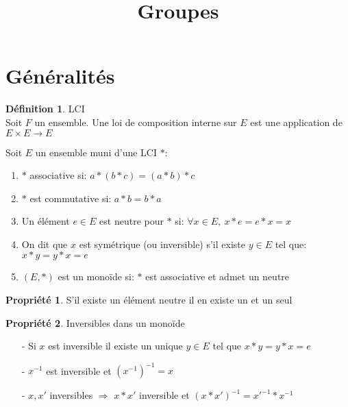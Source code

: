 \documentclass[fleqn]{article}
\title{Groupes}
\date{}
\theoremstyle{definition} \newtheorem*{defi}{D\'efinition}
\theoremstyle{definition} \newtheorem*{theo}{Th\'eor\`eme}
\theoremstyle{definition} \newtheorem*{coro}{Corollaire}
\theoremstyle{remark} \newtheorem*{rqs}{Remarques}
\theoremstyle{definition} \newtheorem*{prop}{Propri\'et\'e}
\begin{document}
\maketitle

\section{G\'en\'eralit\'es}
\begin{defi} LCI \\
Soit $F$ un ensemble. Une loi de composition interne sur $E$ est une application de $E\times E \rightarrow E$
\end{defi}

Soit $E$ un ensemble muni d'une LCI $*$:
\begin{enumerate}
	\item $*$ associative si: $a*(b*c) = (a*b)*c$
	\item $*$ est commutative si: $a*b = b*a$
	\item Un \'el\'ement $e \in E$ est neutre pour $*$ si: $\forall x \in E,\ x*e = e*x = x$
	\item On dit que $x$ est sym\'etrique (ou inversible) s'il existe $y \in E$ tel que: $x*y = y*x = e$
	\item $(E,*)$ est un mono\"ide si: $*$ est associative et admet un neutre
\end{enumerate}

\begin{prop}
	S'il existe un \'el\'ement neutre il en existe un et un seul
\end{prop}

\begin{prop} Inversibles dans un mono\"ide
	\begin{itemize}
		\item [-] Si $x$ est inversible il existe un unique $y \in E$ tel que $x*y = y*x = e$
		\item [-] $x^{-1}$ est inversible et $(x^{-1})^{-1} = x$
		\item [-] $x, x'$ inversibles $\Rightarrow$ $x*x'$ inversible et $(x*x')^{-1} = x'^{-1}*x^{-1}$
	\end{itemize}
\end{prop}
\end{document}
